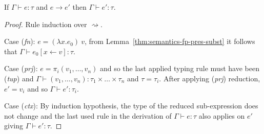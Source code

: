 \begin{theorem}
\label{thm:semantics-fp-pres}
  If $\Gamma \vdash e : \tau$ and $e \rightarrow e'$ then $\Gamma \vdash e' : \tau$.
\end{theorem}
\begin{proof}
  Rule induction over $\rightsquigarrow$.

\vspace{0.25em}\noindent\hangindent=0.6cm
Case (\emph{fn}): $e = (\lambda x.e_0)~v$, from Lemma~\ref{thm:semantics-fp-pres-subst}
  it follows that $\Gamma \vdash e_0[x \leftarrow v] : \tau$.

\vspace{0.25em}\noindent\hangindent=0.6cm
Case (\emph{prj}): $e = \pi_i(v_1, \ldots, v_n)$ and so the last applied typing rule must have been
  (\emph{tup}) and $\Gamma \vdash (v_1, \ldots, v_n) : \tau_1 \times\ldots\times \tau_n$ and
  $\tau = \tau_i$. After applying (\emph{prj}) reduction, $e' = v_i$ and so $\Gamma \vdash e' : \tau_i$.

\vspace{0.25em}\noindent\hangindent=0.6cm
Case (\emph{ctx}): By induction hypothesis, the type of the reduced sub-expression does not change
  and the last used rule in the derivation of $\Gamma \vdash e : \tau$ also applies on $e'$
  giving $\Gamma \vdash e' : \tau$.
\end{proof}

